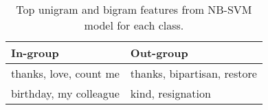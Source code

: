 \begin{table}[t]
    \centering
    \begin{tabular}{ll}
        \toprule
        \textbf{In-group} & \textbf{Out-group} \\ \midrule
        thanks, love, count me & thanks, bipartisan, restore \\
        birthday, my colleague & kind, resignation \\\bottomrule
    \end{tabular}
    \caption{Top unigram and bigram features from NB-SVM model for each class.}
    \label{tab:svm-features}
\end{table}
